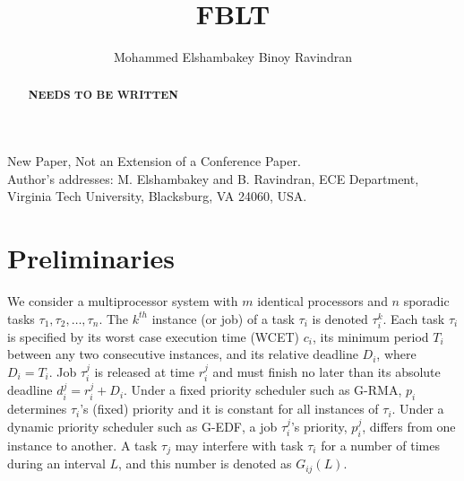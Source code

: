 \documentclass[prodmode,acmtecs]{acmsmall}
\begin{document}

\title{FBLT}
\author{Mohammed Elshambakey
Binoy Ravindran
}

\begin{abstract}
\bf{NEEDS TO BE WRITTEN}
\end{abstract}





\begin{bottomstuff}
New Paper, Not an Extension of a Conference Paper.\\
Author's addresses: M. Elshambakey {and} B. Ravindran, ECE Department,
Virginia Tech University, Blacksburg, VA 24060, USA.
\end{bottomstuff}

\maketitle



\section{Preliminaries}
\label{sec:model}

We consider a multiprocessor system with $m$ identical processors and $n$ sporadic tasks $\tau_1, \tau_2,\ldots, \tau_n$. The $k^{th}$ instance (or job) of a task $\tau_i$ is denoted $\tau_i^k$. Each task $\tau_i$ is specified by its worst case execution time (WCET) $c_i$, its minimum period $T_i$ between any two consecutive instances, and its relative deadline $D_i$, where $D_i=T_i$. Job $\tau_i^j$ is released at time $r_i^j$ and must finish no later than its absolute deadline $d_i^j=r_i^j+D_i$. Under a fixed priority scheduler such as G-RMA, $p_i$ determines $\tau_i$'s (fixed) priority and it is constant for all instances of $\tau_i$. Under a dynamic priority scheduler such as G-EDF, a job $\tau_i^j$'s priority, $p_i^j$, differs from one instance to another. 
A task $\tau_j$ may interfere with task $\tau_i$ for a number of times during an interval $L$, and this number is denoted as $G_{ij}(L)$. 
\end{document}
